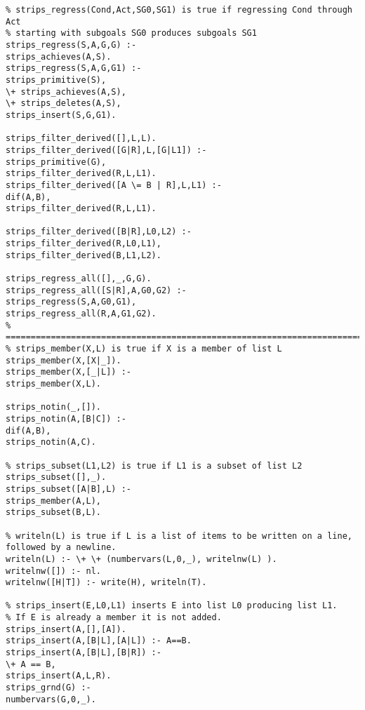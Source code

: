 \begin{lstlisting}
% strips_regress(Cond,Act,SG0,SG1) is true if regressing Cond through Act
% starting with subgoals SG0 produces subgoals SG1
strips_regress(S,A,G,G) :-
strips_achieves(A,S).
strips_regress(S,A,G,G1) :-
strips_primitive(S),
\+ strips_achieves(A,S),
\+ strips_deletes(A,S),
strips_insert(S,G,G1).

strips_filter_derived([],L,L).
strips_filter_derived([G|R],L,[G|L1]) :-
strips_primitive(G),
strips_filter_derived(R,L,L1).
strips_filter_derived([A \= B | R],L,L1) :-
dif(A,B),
strips_filter_derived(R,L,L1).

strips_filter_derived([B|R],L0,L2) :-
strips_filter_derived(R,L0,L1),
strips_filter_derived(B,L1,L2).

strips_regress_all([],_,G,G).
strips_regress_all([S|R],A,G0,G2) :-
strips_regress(S,A,G0,G1),
strips_regress_all(R,A,G1,G2).
% =============================================================================
% strips_member(X,L) is true if X is a member of list L
strips_member(X,[X|_]).
strips_member(X,[_|L]) :-
strips_member(X,L).

strips_notin(_,[]).
strips_notin(A,[B|C]) :-
dif(A,B),
strips_notin(A,C).

% strips_subset(L1,L2) is true if L1 is a subset of list L2
strips_subset([],_).
strips_subset([A|B],L) :-
strips_member(A,L),
strips_subset(B,L).

% writeln(L) is true if L is a list of items to be written on a line, followed by a newline.
writeln(L) :- \+ \+ (numbervars(L,0,_), writelnw(L) ).
writelnw([]) :- nl.
writelnw([H|T]) :- write(H), writeln(T).

% strips_insert(E,L0,L1) inserts E into list L0 producing list L1.
% If E is already a member it is not added.
strips_insert(A,[],[A]).
strips_insert(A,[B|L],[A|L]) :- A==B.
strips_insert(A,[B|L],[B|R]) :-
\+ A == B,
strips_insert(A,L,R).
strips_grnd(G) :-
numbervars(G,0,_).
\end{lstlisting}
